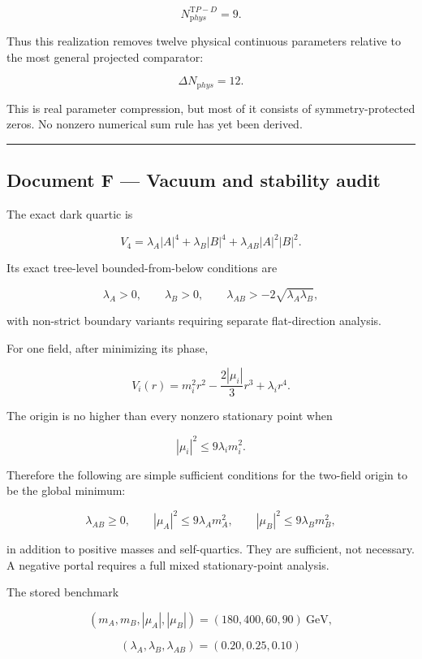 \documentclass[
]{article}
\begin{document}
\[
N_{\mathrm phys}^{\mathrm TP-D}=9.
\]

Thus this realization removes twelve physical continuous parameters
relative to the most general projected comparator:

\[
\Delta N_{\mathrm phys}=12.
\]

This is real parameter compression, but most of it consists of
symmetry-protected zeros. No nonzero numerical sum rule has yet been
derived.

\begin{center}\rule{0.5\linewidth}{0.5pt}\end{center}

\hypertarget{document-f-vacuum-and-stability-audit}{%
\subsection{Document F --- Vacuum and stability
audit}\label{document-f-vacuum-and-stability-audit}}

The exact dark quartic is

\[
V_4=\lambda_A|A|^4+\lambda_B|B|^4+\lambda_{AB}|A|^2|B|^2.
\]

Its exact tree-level bounded-from-below conditions are

\[
\lambda_A>0,\qquad \lambda_B>0,\qquad
\lambda_{AB}>-2\sqrt{\lambda_A\lambda_B},
\]

with non-strict boundary variants requiring separate flat-direction
analysis.

For one field, after minimizing its phase,

\[
V_i(r)=m_i^2r^2-\frac{2|\mu_i|}{3}r^3+\lambda_i r^4.
\]

The origin is no higher than every nonzero stationary point when

\[
|\mu_i|^2\le 9\lambda_i m_i^2.
\]

Therefore the following are simple sufficient conditions for the
two-field origin to be the global minimum:

\[
\lambda_{AB}\ge0,\qquad
|\mu_A|^2\le9\lambda_A m_A^2,\qquad
|\mu_B|^2\le9\lambda_B m_B^2,
\]

in addition to positive masses and self-quartics. They are sufficient,
not necessary. A negative portal requires a full mixed stationary-point
analysis.

The stored benchmark

\[
(m_A,m_B,|\mu_A|,|\mu_B|)=(180,400,60,90)\ \mathrm{GeV},
\]

\[
(\lambda_A,\lambda_B,\lambda_{AB})=(0.20,0.25,0.10)
\]
\end{document}
